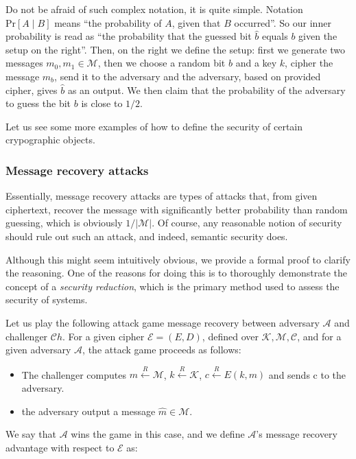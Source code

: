 \documentclass[../lecture-notes.tex]{subfiles}
\begin{document}
Do not be afraid of such complex notation, it is quite simple. Notation $\text{Pr}[A \mid B]$ means ``the probability of $A$, given that $B$ occurred''. So our inner probability is read as ``the probability that the guessed bit $\hat{b}$ equals $b$ given the setup on the right''. Then, on the right we define the setup: first we generate two messages $m_0,m_1 \in \mathcal{M}$, then we choose a random bit $b$ and a key $k$, cipher the message $m_b$, send it to the adversary and the adversary, based on provided cipher, gives $\hat{b}$ as an output. We then claim that the probability of the adversary to guess the bit $b$ is close to $1/2$.

Let us see some more examples of how to define the security of certain crypographic objects.

\subsubsection{Message recovery attacks}

Essentially, message recovery attacks are types of attacks that, from given ciphertext, recover the message with significantly better probability than random guessing, which is obviously $1/|\mathcal{M}|$.
Of course, any reasonable notion of security should rule out such an attack, and indeed, semantic security does.

Although this might seem intuitively obvious, we provide a formal proof to clarify the reasoning. 
One of the reasons for doing this is to thoroughly demonstrate the concept of a \emph{security reduction}, which is the primary method used to assess the security of systems.

Let us play the following attack game message recovery between adversary $\mathcal{A}$ and challenger $\mathcal{C}h$.
For a given cipher $\mathcal{E} = (E, D)$, defined over $\mathcal{K}, \mathcal{M}, \mathcal{C}$, and for a given adversary $\mathcal{A}$, the attack game proceeds as follows: 

\begin{itemize}
    \item The challenger computes $m \xleftarrow{R} \mathcal{M}$, $k \xleftarrow{R} \mathcal{K}$, $c \xleftarrow{R} E(k, m)$ and sends c to the adversary.
    \item the adversary output a message $\hat{m} \in \mathcal{M}$.
\end{itemize}

We say that $\mathcal{A}$ wins the game in this case, and we define $\mathcal{A}$'s message recovery advantage with respect to $\mathcal{E}$ as:
\end{document}
